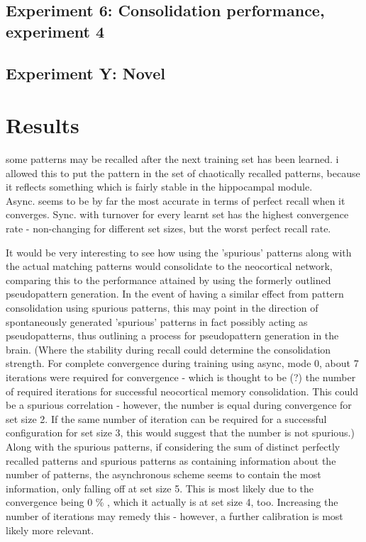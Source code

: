 \subsection{Experiment 6: Consolidation performance, experiment 4}

\subsection{Experiment Y: Novel}


\section{Results}
some patterns may be recalled after the next training set has been learned. i allowed this to put the pattern in the set of chaotically recalled patterns, because it reflects something which is fairly stable in the hippocampal module.
\\

Async. seems to be by far the most accurate in terms of perfect recall when it converges. Sync. with turnover for every learnt set has the highest convergence rate - non-changing for different set sizes, but the worst perfect recall rate.

It would be very interesting to see how using the 'spurious' patterns along with the actual matching patterns would consolidate to the neocortical network, comparing this to the performance attained by using the formerly outlined pseudopattern generation. In the event of having a similar effect from pattern consolidation using spurious patterns, this may point in the direction of spontaneously generated 'spurious' patterns in fact possibly acting as pseudopatterns, thus outlining a process for pseudopattern generation in the brain. (Where the stability during recall could determine the consolidation strength. For complete convergence during training using async, mode 0, about 7 iterations were required for convergence - which is thought to be (?) the number of required iterations for successful neocortical memory consolidation. This could be a spurious correlation - however, the number is equal during convergence for set size 2. If the same number of iteration can be required for a successful configuration for set size 3, this would suggest that the number is not spurious.)
\\

Along with the spurious patterns, if considering the sum of distinct perfectly recalled patterns and spurious patterns as containing information about the number of patterns, the asynchronous scheme seems to contain the most information, only falling off at set size 5. This is most likely due to the convergence being 0 \% , which it actually is at set size 4, too. Increasing the number of iterations may remedy this - however, a further calibration is most likely more relevant.
\\

